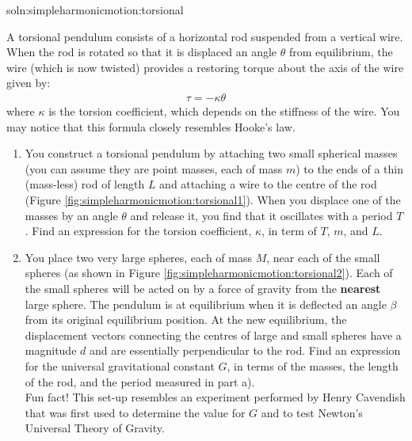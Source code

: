 \begin{problem}{soln:simpleharmonicmotion:torsional}{
\label{prob:simpleharmonicmotion:torsional} A torsional pendulum consists of a horizontal rod suspended from a vertical wire. When the rod is rotated so that it is displaced an angle $\theta$ from equilibrium, the wire (which is now twisted) provides a restoring torque about the axis of the wire given by:
\begin{align*}
\tau=-\kappa\theta
\end{align*}
where $\kappa$ is the torsion coefficient, which depends on the stiffness of the wire. You may notice that this formula closely resembles Hooke's law.
\begin{enumerate}[label=\alph*),topsep=-10pt]
\item  You construct a torsional pendulum by attaching two small spherical masses (you can assume they are point masses, each of mass $m$) to the ends of a thin (mass-less) rod of length $L$ and attaching a wire to the centre of the rod (Figure \ref{fig:simpleharmonicmotion:torsional1}). When you displace one of the masses by an angle $\theta$ and release it, you find that it oscillates with a period $T$. Find an expression for the torsion coefficient, $\kappa$, in term of $T$, $m$, and $L$. 
\item You place two very large spheres, each of mass $M$, near each of the small spheres (as shown in Figure \ref{fig:simpleharmonicmotion:torsional2}). Each of the small spheres will be acted on by a force of gravity from the \textbf{nearest} large sphere. The pendulum is at equilibrium when it is deflected an angle $\beta$ from its original equilibrium position. At the new equilibrium, the displacement vectors connecting the centres of large and small spheres have a magnitude $d$ and are essentially perpendicular to the rod. Find an expression for the universal gravitational constant $G$, in terms of the masses, the length of the rod, and the period measured in part a). 
\\
Fun fact! This set-up resembles an experiment performed by Henry Cavendish that was first used to determine the value for $G$ and to test Newton's Universal Theory of Gravity.
\end{enumerate}}
\end{problem}

